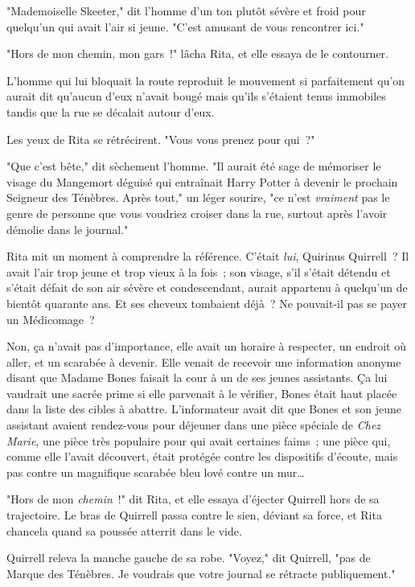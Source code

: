 "Mademoiselle Skeeter," dit l'homme d'un ton plutôt sévère et froid pour quelqu'un qui avait l'air si jeune. "C'est amusant de vous rencontrer ici."

"Hors de mon chemin, mon gars~!" lâcha Rita, et elle essaya de le contourner.

L'homme qui lui bloquait la route reproduit le mouvement si parfaitement qu'on aurait dit qu'aucun d'eux n'avait bougé mais qu'ils s'étaient tenus immobiles tandis que la rue se décalait autour d'eux.

Les yeux de Rita se rétrécirent. "Vous vous prenez pour qui~?"

"Que c'est bête," dit sèchement l'homme. "Il aurait été sage de mémoriser le visage du Mangemort déguisé qui entraînait Harry Potter à devenir le prochain Seigneur des Ténèbres. Après tout," un léger sourire, "ce n'est \emph{vraiment} pas le genre de personne que vous voudriez croiser dans la rue, surtout après l'avoir démolie dans le journal."

Rita mit un moment à comprendre la référence. C'était \emph{lui}, Quirinus Quirrell~? Il avait l'air trop jeune et trop vieux à la fois~; son visage, s'il s'était détendu et s'était défait de son air sévère et condescendant, aurait appartenu à quelqu'un de bientôt quarante ans. Et ses cheveux tombaient déjà~? Ne pouvait-il pas se payer un Médicomage~?

Non, ça n'avait pas d'importance, elle avait un horaire à respecter, un endroit où aller, et un scarabée à devenir. Elle venait de recevoir une information anonyme disant que Madame Bones faisait la cour à un de ses jeunes assistants. Ça lui vaudrait une sacrée prime si elle parvenait à le vérifier, Bones était haut placée dans la liste des cibles à abattre. L'informateur avait dit que Bones et son jeune assistant avaient rendez-vous pour déjeuner dans une pièce spéciale de \emph{Chez Marie}, une pièce très populaire pour qui avait certaines faims~; une pièce qui, comme elle l'avait découvert, était protégée contre les dispositifs d'écoute, mais pas contre un magnifique scarabée bleu lové contre un mur…

"Hors de mon \emph{chemin}~!" dit Rita, et elle essaya d'éjecter Quirrell hors de sa trajectoire. Le bras de Quirrell passa contre le sien, déviant sa force, et Rita chancela quand sa poussée atterrit dans le vide.

Quirrell releva la manche gauche de sa robe. "Voyez," dit Quirrell, "pas de Marque des Ténèbres. Je voudrais que votre journal se rétracte publiquement."

